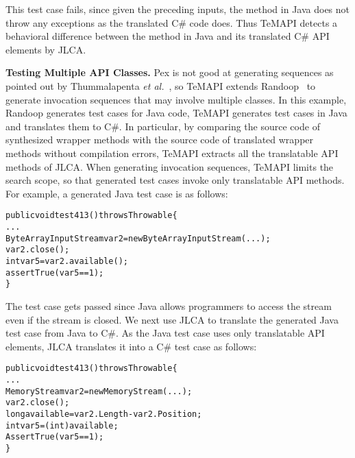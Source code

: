 This test case fails, since given the preceding inputs, the  method in Java does not throw any exceptions as the translated C\# code does. Thus TeMAPI detects a behavioral difference between the  method in Java and its translated C\# API elements by JLCA.

\textbf{Testing Multiple API Classes.} Pex is not good at generating sequences as pointed out by Thummalapenta \emph{et al.}~\cite{thummalapenta09:mseqgen}, so TeMAPI extends Randoop~\cite{pacheco2007feedback} to generate invocation sequences that may involve multiple classes. In this example, Randoop generates test cases for Java code, TeMAPI generates test cases in Java and translates them to C\#. In particular, by comparing the source code of synthesized wrapper methods with the source code of translated wrapper methods without compilation errors, TeMAPI extracts all the translatable API methods of JLCA. When generating invocation sequences, TeMAPI limits the search scope, so that generated test cases invoke only translatable API methods. For example, a generated Java test case is as follows:

\begin{CodeOut}\vspace*{-1ex}
\begin{alltt}
public void test413() throws Throwable\{
  ...
  ByteArrayInputStream var2=new ByteArrayInputStream(...);
  var2.close();
  int var5=var2.available();
  assertTrue(var5 == 1);
\}
\end{alltt}
\end{CodeOut}\vspace*{-2ex}


The test case gets passed since Java allows programmers to access the stream even if the stream is closed. We next use JLCA to translate the generated Java test case from Java to C\#. As the Java test case uses only translatable API elements, JLCA translates it into a C\# test case as follows:

\begin{CodeOut}\vspace*{-1ex}
\begin{alltt}
public void test413() throws Throwable\{
  ...
  MemoryStream var2 = new MemoryStream(...);
  var2.close();
  long available = var2.Length - var2.Position;
  int var5 = (int) available;
  AssertTrue(var5 == 1);
\}
\end{alltt}
\end{CodeOut}\vspace*{-2ex}


